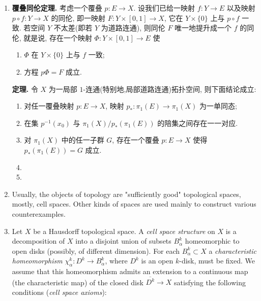 \documentclass{ctexart}
\begin{document}
\begin{enumerate}
\item \textbf{覆叠同伦定理.} 考虑一个覆叠 $p : E \to X$. 设我们已给一映射 $f : Y \to E$ 以及映射 $p \circ f : Y \to X$ 的同伦, 即一映射 $F : Y \times [0,1] \to X$, 它在 $Y\times \{0\}$ 上与 $p\circ f$ 一致. 若空间 $Y$ 不太差(即若 $Y$ 为道路连通), 则同伦 $F$ 唯一地提升成一个 $f$ 的同伦, 就是说, 存在一个映射 $\Phi : Y\times [0,1]\to E$ 使
\begin{adjustwidth}{2em}{}
    \begin{enumerate}
      \item $\Phi$ 在 $Y\times \{0\}$ 上与 $f$ 一致;
      \item 方程 $p\Phi = F$ 成立.
    \end{enumerate}
\end{adjustwidth}
\begin{center}
\end{center}

\textbf{定理.} 令 $X$ 为一局部 $1$-连通(特别地,局部道路连通)拓扑空间, 则下面结论成立:
\begin{enumerate}
  \item 对任一覆叠映射 $p: E \to X$, 映射 $p_\ast: \pi_1(E) \to \pi_1(X)$ 为一单同态;
  \item 在集 $p^{-1}(x_0)$ 与 $\pi_1(X)/p_\ast(\pi_1(E))$ 的陪集之间存在一一对应.
  \item 对 $\pi_1(X)$ 中的任一子群 $G$, 存在一个覆叠 $p : E \to X$ 使得 $p_\ast(\pi_1(E)) = G$ 成立.
  \item
  \item
\end{enumerate}

\item Usually, the objects of topology are "sufficiently good"
  topological spaces, mostly, cell spaces. Other kinds of spaces are
  used mainly to construct various counterexamples.

\item Let $X$ be a Hausdorff topological space. A \textit{cell space
    structure} on $X$ is a decomposition of $X$ into a disjoint union
  of subsets $B_\alpha^k$ homeomorphic to open disks (possibly, of
  different dimension). For each $B_\alpha^k \subset X$ a
  \textit{characteristic homeomorphism} $\chi_\alpha^k : D^k \to
  B_\alpha^k$, where $D^k$ is an open $k$-disk, must be fixed. We
  assume that this homeomorphism admits an extension to a continuous
  map (the characteristic map) of the closed disk $\overline{D^k} \to X$
  satisfying the following conditions (\textit{cell space axioms}):


\end{enumerate}
\end{document}
